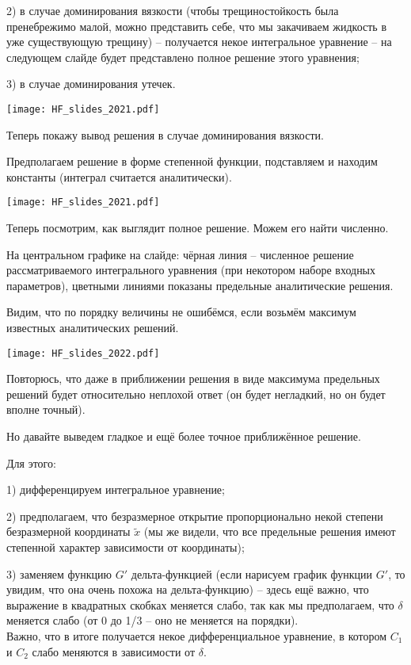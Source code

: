 \documentclass[main.tex]{subfiles}
\begin{document}
2) в случае доминирования вязкости (чтобы трещиностойкость была пренебрежимо малой, можно представить себе, что мы закачиваем жидкость в уже существующую трещину) -- получается некое интегральное уравнение -- на следующем слайде будет представлено полное решение этого уравнения;

3) в случае доминирования утечек.

\texttt{[image: HF\_slides\_2021.pdf]}

Теперь покажу вывод решения в случае доминирования вязкости.

Предполагаем решение в форме степенной функции, подставляем и находим константы (интеграл считается аналитически).

\texttt{[image: HF\_slides\_2021.pdf]}

Теперь посмотрим, как выглядит полное решение.
Можем его найти численно.

На центральном графике на слайде: чёрная линия -- численное решение рассматриваемого интегрального уравнения (при некотором наборе входных параметров), цветными линиями показаны предельные аналитические решения.

Видим, что по порядку величины не ошибёмся, если возьмём максимум известных аналитических решений.

\texttt{[image: HF\_slides\_2022.pdf]}

Повторюсь, что даже в приближении решения в виде максимума предельных решений будет относительно неплохой ответ (он будет негладкий, но он будет вполне точный).

Но давайте выведем гладкое и ещё более точное приближённое решение.

Для этого:

1) дифференцируем интегральное уравнение;

2) предполагаем, что безразмерное открытие пропорционально некой степени безразмерной координаты $\tilde{x}$ (мы же видели, что все предельные решения имеют степенной характер зависимости от координаты);

3) заменяем функцию $G'$ дельта-функцией (если нарисуем график функции $G'$, то увидим, что она очень похожа на дельта-функцию) -- здесь ещё важно, что выражение в квадратных скобках меняется слабо, так как мы предполагаем, что $\delta$ меняется слабо (от 0 до 1/3 -- оно не меняется на порядки).
\\

Важно, что в итоге получается некое дифференциальное уравнение, в котором $C_1$ и $C_2$ слабо меняются в зависимости от $\delta$.
\end{document}
